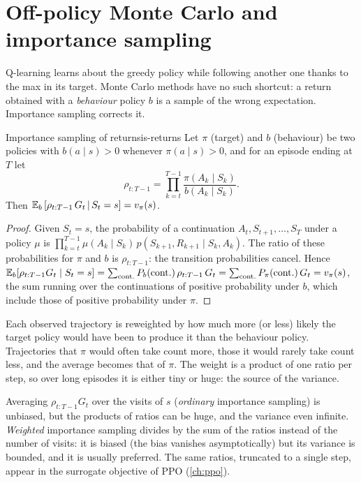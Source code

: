 \section{Off-policy Monte Carlo and importance sampling}

Q-learning learns about the greedy policy while following another one
thanks to the max in its target. Monte Carlo methods have no such
shortcut: a return obtained with a \emph{behaviour} policy $b$ is a sample
of the wrong expectation. Importance sampling corrects it.

\begin{proposition}{Importance sampling of returns}{is-returns}
  Let $\pi$ (target) and $b$ (behaviour) be two policies with $b(a \mid s) >
  0$ whenever $\pi(a \mid s) > 0$, and for an episode ending at $T$ let
  \begin{equation}
    \rho_{t:T-1} = \prod_{k=t}^{T-1} \frac{\pi(A_k \mid S_k)}{b(A_k \mid
    S_k)}.
  \end{equation}
  Then $\mathbb{E}_b\left[\rho_{t:T-1}\, G_t \,\middle|\, S_t = s\right] = v_\pi(s)$.
\end{proposition}

\begin{proof}
  Given $S_t = s$, the probability of a continuation $A_t, S_{t+1}, \dots,
  S_T$ under a policy $\mu$ is $\prod_{k=t}^{T-1} \mu(A_k \mid S_k)\,
  p(S_{k+1}, R_{k+1} \mid S_k, A_k)$. The ratio of these probabilities for
  $\pi$ and $b$ is $\rho_{t:T-1}$: the transition probabilities cancel.
  Hence $\mathbb{E}_b[\rho_{t:T-1} G_t \mid S_t = s] = \sum_{\text{cont.}}
  P_b(\text{cont.})\, \rho_{t:T-1}\, G_t = \sum_{\text{cont.}}
  P_\pi(\text{cont.})\, G_t = v_\pi(s)$, the sum running over the
  continuations of positive probability under $b$, which include those of
  positive probability under $\pi$.
\end{proof}

\begin{intuition}
  Each observed trajectory is reweighted by how much more (or less) likely
  the target policy would have been to produce it than the behaviour
  policy. Trajectories that $\pi$ would often take count more, those it
  would rarely take count less, and the average becomes that of $\pi$. The
  weight is a product of one ratio per step, so over long episodes it is
  either tiny or huge: the source of the variance.
\end{intuition}

Averaging $\rho_{t:T-1} G_t$ over the visits of $s$ (\emph{ordinary}
importance sampling) is unbiased, but the products of ratios can be huge,
and the variance even infinite. \emph{Weighted} importance sampling divides
by the sum of the ratios instead of the number of visits: it is biased (the
bias vanishes asymptotically) but its variance is bounded, and it is
usually preferred. The same ratios, truncated to a single step, appear in
the surrogate objective of PPO (\cref{ch:ppo}).

